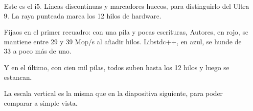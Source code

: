 Este es el i5. Líneas discontinuas y marcadores huecos, para distinguirlo del Ultra 9. La raya punteada marca los 12 hilos de hardware.

Fijaos en el primer recuadro: con una pila y pocas escrituras, Autores, en rojo, se mantiene entre 29 y 39 Mop/s al añadir hilos. Libstdc++, en azul, se hunde de 33 a poco más de uno.

Y en el último, con cien mil pilas, todos suben hasta los 12 hilos y luego se estancan.

La escala vertical es la misma que en la diapositiva siguiente, para poder comparar a simple vista.
